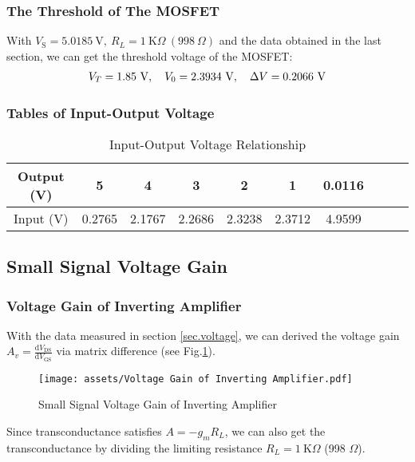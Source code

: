 \documentclass[UTF8]{article}
\def\KO{\ \mathrm{K}\Omega}
\def\KO{\ \mathrm{K}\Omega}
\theoremstyle{MyLineTheoremStyle} %
\theoremstyle{MyBlockTheoremStyle} %
\theoremstyle{MySubsubsectionStyle} %
\begin{document}
\subsubsection{The Threshold of The MOSFET}
With $V_\text{S} = 5.0185 \ \mathrm{V},\ R_L = 1 \KO\ (998\ \Omega)$ and the data obtained in the last section, we can get the threshold voltage of the MOSFET:
\begin{gather}
\boldmath
V_T = 1.85 \ \mathrm{V},\quad V_0 = 2.3934 \ \mathrm{V},\quad \Delta V = 0.2066 \ \mathrm{V}
\end{gather}

\subsubsection{Tables of Input-Output Voltage}
\begin{table}[H]\centering
    \caption{Input-Output Voltage Relationship}
    \label{Input-Output Voltage Relationship}
\begin{tabular}{cccccccccc}\toprule
    Output (V) & 5 & 4 & 3 & 2 & 1 & 0.0116\\
    \midrule
    Input (V) & 0.2765 & 2.1767 & 2.2686 & 2.3238 & 2.3712 & 4.9599 \\
    \bottomrule
\end{tabular}
\end{table}


\subsection{Small Signal Voltage Gain}
\subsubsection{Voltage Gain of Inverting Amplifier}\label{sec.voltage gain}
With the data measured in section \ref{sec.voltage}, we can derived the voltage gain $A_v = \frac{\mathrm{d} V_\text{DS} }{\mathrm{d} V_\text{GS} }$ via matrix difference (see Fig.\ref{Voltage Gain}).
\begin{figure}[H]\centering
    \texttt{[image: assets/Voltage Gain of Inverting Amplifier.pdf]}
    \caption{Small Signal Voltage Gain of Inverting Amplifier}
    \label{Voltage Gain}
\end{figure}
Since transconductance satisfies $A = -g_m R_L$, we can also get the transconductance by dividing the limiting resistance $R_L = 1 \KO$ (998 $\Omega$).
\end{document}
